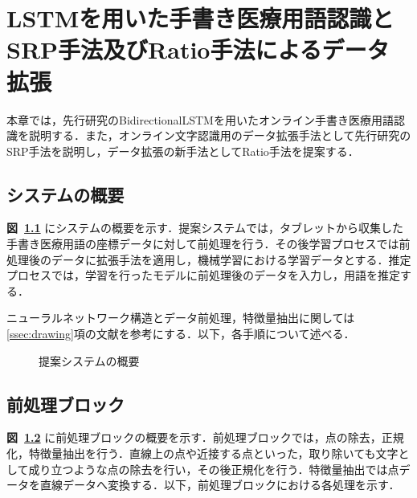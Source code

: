 
\chapter{LSTMを用いた手書き医療用語認識とSRP手法及びRatio手法によるデータ拡張}
\label{cha:propose}
本章では，先行研究\cite{takahashi}のBidirectionalLSTMを用いたオンライン手書き医療用語認識を説明する．また，オンライン文字認識用のデータ拡張手法として先行研究\cite{takahashi}のSRP手法を説明し，データ拡張の新手法としてRatio手法を提案する．
\section{システムの概要}
\label{sec:concept}
\textbf{図~\ref{sys_concept}} にシステムの概要を示す．提案システムでは，タブレットから収集した手書き医療用語の座標データに対して前処理を行う．その後学習プロセスでは前処理後のデータに拡張手法を適用し，機械学習における学習データとする．推定プロセスでは，学習を行ったモデルに前処理後のデータを入力し，用語を推定する．

ニューラルネットワーク構造とデータ前処理，特徴量抽出に関しては\ref{ssec:drawing}項の文献\cite{zhang18:drawing}を参考にする．以下，各手順について述べる．

\begin{figure}[tb]
 \begin{center}
  \caption{提案システムの概要}
  \label{sys_concept}
\end{center}
\end{figure}

\section{前処理ブロック}
\label{preprocess}
\textbf{図~\ref{preprocess}} に前処理ブロックの概要を示す．前処理ブロックでは，点の除去，正規化，特徴量抽出を行う．直線上の点や近接する点といった，取り除いても文字として成り立つような点の除去を行い，その後正規化を行う．特徴量抽出では点データを直線データへ変換する．以下，前処理ブロックにおける各処理を示す．

